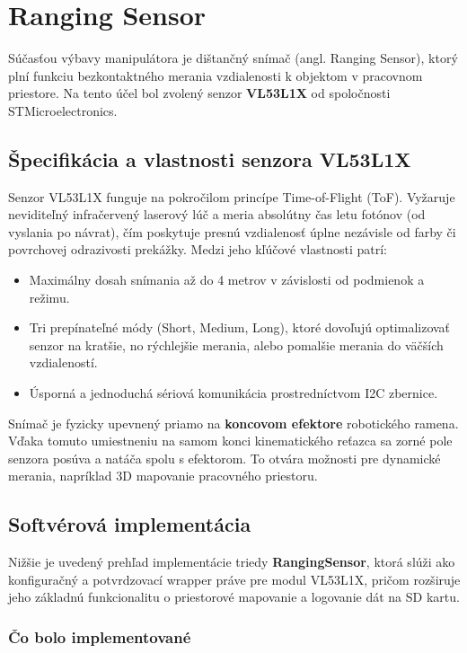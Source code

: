 \section{Ranging Sensor}

Súčasťou výbavy manipulátora je dištančný snímač (angl. Ranging Sensor), ktorý plní funkciu bezkontaktného merania vzdialenosti k objektom v pracovnom priestore. Na tento účel bol zvolený senzor \textbf{VL53L1X} od spoločnosti STMicroelectronics. 

\subsection{Špecifikácia a vlastnosti senzora VL53L1X}
Senzor VL53L1X funguje na pokročilom princípe Time-of-Flight (ToF). Vyžaruje neviditeľný infračervený laserový lúč a meria absolútny čas letu fotónov (od vyslania po návrat), čím poskytuje presnú vzdialenosť úplne nezávisle od farby či povrchovej odrazivosti prekážky.
Medzi jeho kľúčové vlastnosti patrí:
\begin{itemize}
    \item Maximálny dosah snímania až do 4 metrov v závislosti od podmienok a režimu.
    \item Tri prepínateľné módy (Short, Medium, Long), ktoré dovoľujú optimalizovať senzor na kratšie, no rýchlejšie merania, alebo pomalšie merania do väčších vzdialeností.
    \item Úsporná a jednoduchá sériová komunikácia prostredníctvom I2C zbernice.
\end{itemize}

Snímač je fyzicky upevnený priamo na \textbf{koncovom efektore} robotického ramena. Vďaka tomuto umiestneniu na samom konci kinematického reťazca sa zorné pole senzora posúva a 
natáča spolu s efektorom. To otvára možnosti pre dynamické merania, napríklad 3D mapovanie pracovného priestoru.

\subsection{Softvérová implementácia}
Nižšie je uvedený prehľad implementácie triedy \textbf{RangingSensor}, ktorá slúži ako konfiguračný a potvrdzovací wrapper práve pre modul VL53L1X, pričom rozširuje jeho základnú funkcionalitu o priestorové mapovanie a logovanie dát na SD kartu.

\subsubsection{Čo bolo implementované}

